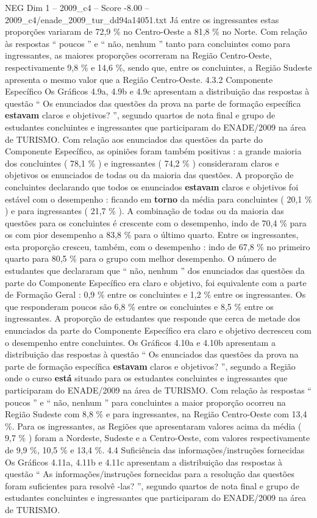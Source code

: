 \begin{textsample}{NEG Dim 1 – 2009\_c4 – Score -8.00 – 2009\_c4/enade\_2009\_tur\_dd94a14051.txt}
Já entre os ingressantes estas proporções variaram de 72,9 \% no Centro-Oeste a 81,8 \% no Norte.
Com relação às respostas “ poucos ” e “ não, nenhum ” tanto para concluintes como para ingressantes, as maiores proporções ocorreram na Região Centro-Oeste, respectivamente 9,8 \% e 14,6 \%, sendo que, entre os concluintes, a Região Sudeste apresenta o mesmo valor que a Região Centro-Oeste. 4.3.2 Componente Específico Os Gráficos 4.9a, 4.9b e 4.9c apresentam a distribuição das respostas à questão “ Os enunciados das questões da prova na parte de formação específica \textbf{estavam} claros e objetivos? ”, segundo quartos de nota final e grupo de estudantes concluintes e ingressantes que participaram do ENADE/2009 na área de TURISMO.
Com relação aos enunciados das questões da parte do Componente Específico, as opiniões foram também positivas : a grande maioria dos concluintes ( 78,1 \% ) e ingressantes ( 74,2 \% ) consideraram claros e objetivos os enunciados de todas ou da maioria das questões.
A proporção de concluintes declarando que todos os enunciados \textbf{estavam} claros e objetivos foi estável com o desempenho : ficando em \textbf{torno} da média para concluintes ( 20,1 \% ) e para ingressantes ( 21,7 \% ).
A combinação de todas ou da maioria das questões para os concluintes é crescente com o desempenho, indo de 70,4 \% para os com pior desempenho a 83,8 \% para o último quarto.
Entre os ingressantes, esta proporção cresceu, também, com o desempenho : indo de 67,8 \% no primeiro quarto para 80,5 \% para o grupo com melhor desempenho.
O número de estudantes que declararam que “ não, nenhum ” dos enunciados das questões da parte do Componente Específico era claro e objetivo, foi equivalente com a parte de Formação Geral : 0,9 \% entre os concluintes e 1,2 \% entre os ingressantes.
Os que responderam poucos são 6,8 \% entre os concluintes e 8,5 \% entre os ingressantes.
A proporção de estudantes que responde que cerca de metade dos enunciados da parte do Componente Específico era claro e objetivo decresceu com o desempenho entre concluintes.
Os Gráficos 4.10a e 4.10b apresentam a distribuição das respostas à questão “ Os enunciados das questões da prova na parte de formação específica \textbf{estavam} claros e objetivos? ”, segundo a Região onde o curso \textbf{está} situado para os estudantes concluintes e ingressantes que participaram do ENADE/2009 na área de TURISMO.
Com relação às respostas “ poucos ” e “ não, nenhum ” para concluintes a maior proporção ocorreu na Região Sudeste com 8,8 \% e para ingressantes, na Região Centro-Oeste com 13,4 \%.
Para os ingressantes, as Regiões que apresentaram valores acima da média ( 9,7 \% ) foram a Nordeste, Sudeste e a Centro-Oeste, com valores respectivamente de 9,9 \%, 10,5 \% e 13,4 \%. 4.4 Suficiência das informações/instruções fornecidas Os Gráficos 4.11a, 4.11b e 4.11c apresentam a distribuição das respostas à questão “ As informações/instruções fornecidas para a resolução das questões foram suficientes para resolvê -las? ”, segundo quartos de nota final e grupo de estudantes concluintes e ingressantes que participaram do ENADE/2009 na área de TURISMO.

\end{textsample}
